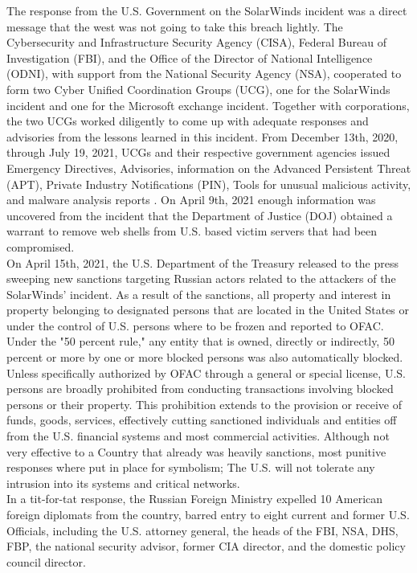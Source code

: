 \documentclass[conference]{IEEEtran}
\begin{document}
The response from the U.S. Government on the SolarWinds incident was a direct message that the west was not going to take
this breach lightly. The Cybersecurity and Infrastructure Security Agency (CISA), Federal Bureau of Investigation (FBI), and the
Office of the Director of National Intelligence (ODNI), with support from the National Security Agency (NSA),
cooperated to form two Cyber Unified Coordination Groups (UCG), one for the SolarWinds incident and one for the
Microsoft exchange incident\cite{GAOSolarWindsExchange}. Together with corporations, the two UCGs worked diligently to come up with adequate responses
and advisories from the lessons learned in this incident. From December 13th, 2020, through July 19, 2021, UCGs and their
respective government agencies issued Emergency Directives, Advisories, information on the Advanced Persistent Threat (APT),
Private Industry Notifications (PIN), Tools for unusual malicious activity, and malware analysis reports
\cite{GAOSolarWindsExchange}. On April 9th, 2021 enough information was uncovered from the incident that the Department
of Justice (DOJ) obtained a warrant to remove web shells from U.S. based victim servers that had been compromised.\\
On April 15th, 2021, the U.S. Department of the Treasury released to the press sweeping new sanctions targeting Russian actors related to
the attackers of the SolarWinds' incident. As a result of the sanctions, all property and interest in property
belonging to designated persons that are located in the United States or under the control of U.S. persons
where to be frozen and reported to OFAC. Under the "50 percent rule," any entity that is owned, directly or indirectly, 50 percent or more by one
or more blocked persons was also automatically blocked. Unless specifically authorized by OFAC through a general or
special license, U.S. persons are broadly prohibited from conducting transactions involving blocked persons or their property. This 
prohibition extends to the provision or receive of funds, goods, services, effectively cutting sanctioned individuals
and entities off from the U.S. financial systems and most commercial activities\cite{DepartmentOfTreasuryResponse}. Although not very effective
to a Country that already was heavily sanctions, most punitive responses where put in place for symbolism; The U.S. will not tolerate any intrusion into
its systems and critical networks.\\ 
In a tit-for-tat response, the Russian Foreign Ministry expelled 10 American foreign diplomats from the country, barred entry to eight current and former
U.S. Officials, including the U.S. attorney general, the heads of the FBI, NSA, DHS, FBP, the national security advisor, former
CIA director, and the domestic policy council director.\cite{TheGuardianRussiaExpelsDiplomats}
\end{document}
